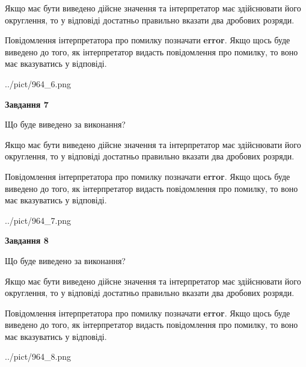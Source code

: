 \documentclass[12pt, ukrainian]{article}
\begin{document}
{\begin {Large}
Якщо має бути виведено дійсне значення та інтерпретатор має здійснювати його округлення, 
то у відповіді достатньо правильно вказати два дробових розряди.

Повідомлення інтерпретатора про помилку позначати \textbf{error}.
Якщо щось буде виведено до того, як інтерпретатор видасть повідомлення про помилку, 
то воно має вказуватись у відповіді. \par

\begin{center}
	{../pict/964_6.png}
\end{center}
\newpage

{\begin {center}\textbf{Завдання 7}\end {center}}\par
Що буде виведено за виконання? \par

Якщо має бути виведено дійсне значення та інтерпретатор має здійснювати його округлення, 
то у відповіді достатньо правильно вказати два дробових розряди.

Повідомлення інтерпретатора про помилку позначати \textbf{error}.
Якщо щось буде виведено до того, як інтерпретатор видасть повідомлення про помилку, 
то воно має вказуватись у відповіді. \par

\begin{center}
	{../pict/964_7.png}
\end{center}
\newpage

{\begin {center}\textbf{Завдання 8}\end {center}}\par
Що буде виведено за виконання? \par

Якщо має бути виведено дійсне значення та інтерпретатор має здійснювати його округлення, 
то у відповіді достатньо правильно вказати два дробових розряди.

Повідомлення інтерпретатора про помилку позначати \textbf{error}.
Якщо щось буде виведено до того, як інтерпретатор видасть повідомлення про помилку, 
то воно має вказуватись у відповіді. \par

\begin{center}
	{../pict/964_8.png}
\end{center}
\newpage


\end{Large}}
\end{document}
